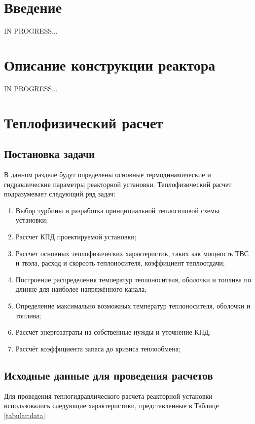 \section*{Введение}
%
IN PROGRESS...


\section{Описание конструкции реактора}
IN PROGRESS...



\section{Теплофизический расчет}

\subsection{Постановка задачи}
В данном разделе будут определены основные термодинамические и гидравлические параметры реакторной установки. Теплофизический расчет подразумевает следующий ряд задач:

    \begin{enumerate}
        \item Выбор турбины и разработка принципиальной теплосиловой схемы установки;
        \item Рассчет КПД проектируемой установки;
        \item Рассчет основных теплофизических характеристик, таких как мощность ТВС и твэла, расход и скорсоть теплоносителя, коэффициент теплоотдачи;
        \item Построение распределения температур теплоносителя, оболочки и топлива по длинне для наиболее напряжённого канала; 
        \item Определение максимально возможных температур теплоносителя, оболочки и топлива;
        \item Рассчёт энергозатраты на собственные нужды и уточнение КПД;
        \item Рассчёт коэффициента запаса до кризиса теплообмена;
    \end{enumerate}

\subsection{Исходные данные для проведения расчетов}


Для проведения теплогидравлического расчета реакторной установки использовались следующие характеристики, представленные в Таблице \ref{tabular:data}.

